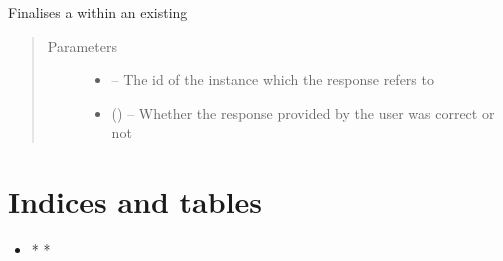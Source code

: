 \documentclass[letterpaper,10pt,english]{sphinxmanual}
\begin{document}
\begin{fulllineitems}
\begin{fulllineitems}
\end{fulllineitems}


\begin{fulllineitems}
\label{\detokenize{user:user.User.validate}}
Finalises a  within an existing 
\begin{quote}\begin{description}
\item[{Parameters}] \leavevmode\begin{itemize}
\item {} 
 -- The id of the instance which the response refers to

\item {} 
 () -- Whether the response provided by the user was correct or not

\end{itemize}

\end{description}\end{quote}

\end{fulllineitems}


\end{fulllineitems}



\chapter{Indices and tables}
\label{\detokenize{index:indices-and-tables}}\begin{itemize}
\item {} 
* 
* 

\end{itemize}
\end{document}
